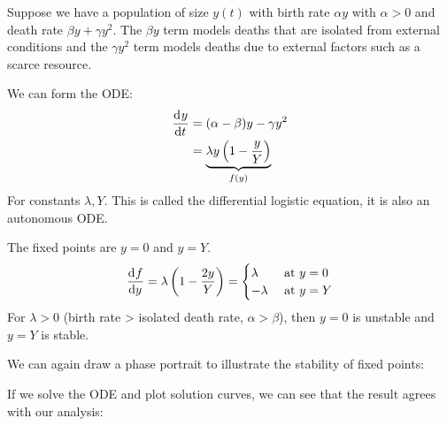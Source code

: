 \documentclass[../main.tex]{subfiles}
\begin{document}
\begin{example}
  \label{populationExample}
  Suppose we have a population of size $y(t)$ with birth rate $\alpha y$ with $\alpha > 0$ and death rate $\beta y + \gamma y^2$.
  The $\beta y$ term models deaths that are isolated from external conditions and the $\gamma y^2$ term models deaths due to external factors such as a scarce resource.

  We can form the ODE:
  \begin{align*}
    \deriv{y}{t} &= (\alpha - \beta)y - \gamma y^2 \\
                 &= \underbrace{\lambda y\left(1 - \frac{y}{Y}\right)}_{f(y)}
  \end{align*}
  For constants $\lambda, Y$.
  This is called the differential logistic equation, it is also an autonomous ODE.

  The fixed points are $y= 0$ and $y = Y$.
  \[
    \deriv{f}{y} = \lambda\left(1-\frac{2y}{Y}\right) = \begin{cases}
    \lambda & \text{ at }y=0 \\
    -\lambda & \text{ at } y=Y
    \end{cases}
  \]
  For $\lambda > 0$ (birth rate > isolated death rate, $\alpha > \beta$), then $y = 0$ is unstable and $y = Y$ is stable.
  \begin{center}
  \end{center}
  We can again draw a phase portrait to illustrate the stability of fixed points:
  \begin{center}
  \end{center}
  If we solve the ODE and plot solution curves, we can see that the result agrees with our analysis:
  \begin{center}
\end{center}
\end{example}
\end{document}
